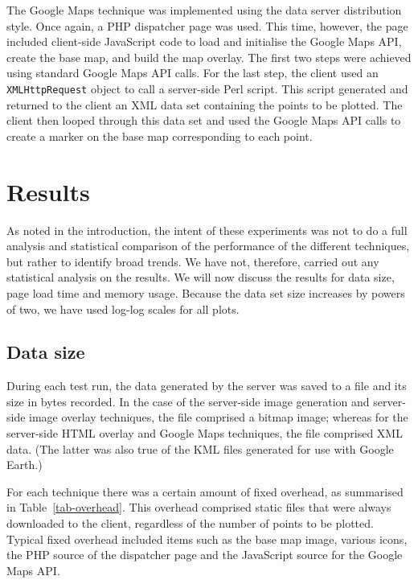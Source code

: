 \documentclass[acmtocl,acmnow]{acmtrans2m}
\begin{document}
The Google Maps technique was implemented using the data server
distribution style. Once again, a PHP dispatcher page was used. This
time, however, the page included client-side JavaScript code to load and
initialise the Google Maps API, create the base map, and build the map
overlay. The first two steps were achieved using standard Google Maps
API calls. For the last step, the client used an \texttt{XMLHttpRequest}
object to call a server-side Perl script. This script generated and
returned to the client an XML data set containing the points to be
plotted. The client then looped through this data set and used the
Google Maps API calls to create a marker on the base map corresponding
to each point.


\section{Results}
\label{sec-results}

As noted in the introduction, the intent of these experiments was not to
do a full analysis and statistical comparison of the performance of the
different techniques, but rather to identify broad trends. We have not,
therefore, carried out any statistical analysis on the results. We will
now discuss the results for data size, page load time and memory usage.
Because the data set size increases by powers of two, we have used
log-log scales for all plots.


\subsection{Data size}

During each test run, the data generated by the server was saved to a
file and its size in bytes recorded. In the case of the server-side
image generation and server-side image overlay techniques, the file
comprised a bitmap image; whereas for the server-side HTML overlay and
Google Maps techniques, the file comprised XML data. (The latter was
also true of the KML files generated for use with Google Earth.)

For each technique there was a certain amount of fixed overhead, as
summarised in Table~\ref{tab-overhead}. This overhead comprised static
files that were always downloaded to the client, regardless of the
number of points to be plotted. Typical fixed overhead included items
such as the base map image, various icons, the PHP source of the
dispatcher page and the JavaScript source for the Google Maps API.
\end{document}
